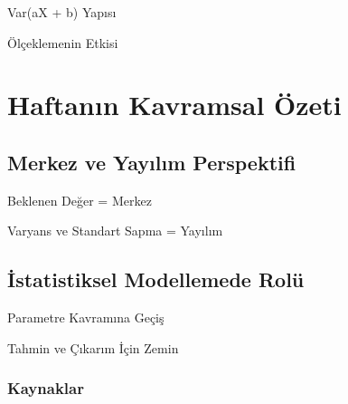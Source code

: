 \documentclass[light]{lutbeamer}
\begin{document}
\begin{frame}{Var(aX + b) Yapısı}
\end{frame}

\begin{frame}{Ölçeklemenin Etkisi}
\end{frame}

\section{Haftanın Kavramsal Özeti}
\subsection{Merkez ve Yayılım Perspektifi}

\begin{frame}{Beklenen Değer = Merkez}
\end{frame}

\begin{frame}{Varyans ve Standart Sapma = Yayılım}
\end{frame}

\subsection{İstatistiksel Modellemede Rolü}

\begin{frame}{Parametre Kavramına Geçiş}
\end{frame}

\begin{frame}{Tahmin ve Çıkarım İçin Zemin}
\end{frame}


\begin{frame}[allowframebreaks]
  \frametitle{Kaynaklar}
  \nocite{walpole_ch4}
  \printbibliography{}
\end{frame}

\appendix
\end{document}
